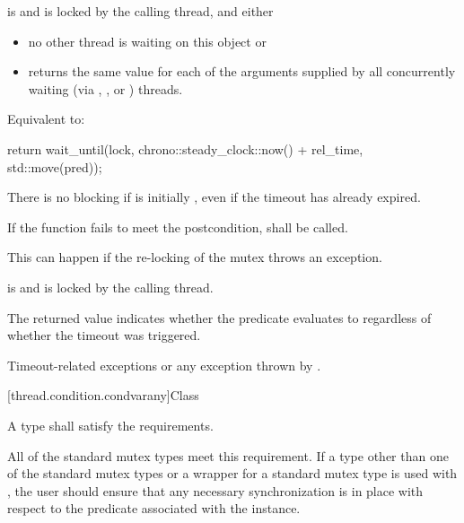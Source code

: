 \begin{itemdescr}
\pnum
\requires {} is  and 
is locked by the calling thread, and either
\begin{itemize}
\item
no other thread is waiting on this  object or

\item
{} returns the same value for each of the  arguments
supplied by all concurrently waiting (via , , or
) threads.
\end{itemize}

\pnum
\effects Equivalent to:
\begin{codeblock}
return wait_until(lock, chrono::steady_clock::now() + rel_time, std::move(pred));
\end{codeblock}

\pnum
\begin{note} There is no blocking if  is initially , even if the
timeout has already expired. \end{note}

\pnum
\remarks
If the function fails to meet the postcondition, 
shall be called.
\begin{note} This can happen if the re-locking of the mutex throws an exception. \end{note}

\pnum
\postconditions {} is  and 
is locked by the calling thread.

\pnum
\begin{note} The returned value indicates whether the predicate evaluates to 
regardless of whether the timeout was triggered. \end{note}

\pnum
\throws Timeout-related
exceptions or any exception thrown by .

\end{itemdescr}

[thread.condition.condvarany]{Class }

\pnum
A  type shall satisfy the 
requirements. \begin{note} All of the standard
mutex types meet this requirement. If a  type other than one of the
standard mutex types or a  wrapper for a standard mutex type
is used with , the user should ensure that any
necessary synchronization is in place with respect to the predicate associated
with the  instance. \end{note}

